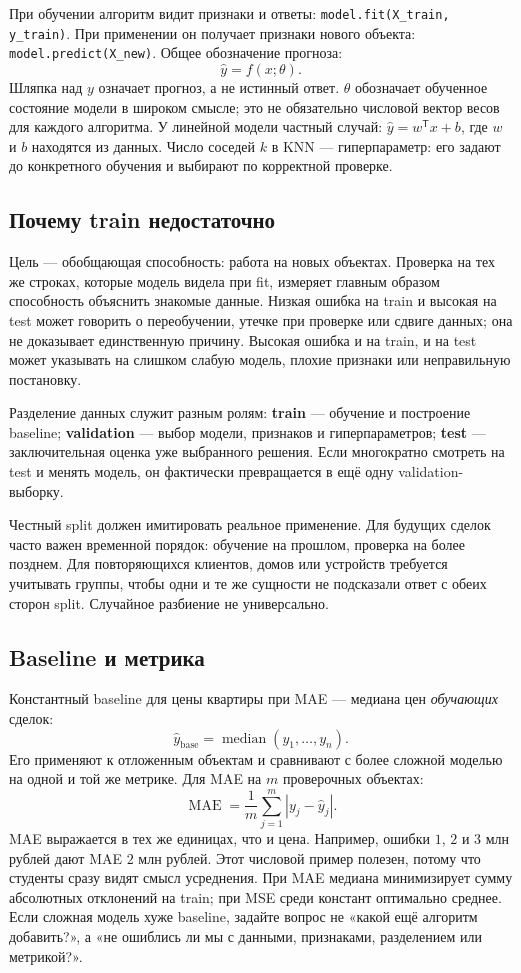 \documentclass[11pt,a4paper]{article}
\newcommand{\term}[1]{\textbf{\color{navy}#1}}
\begin{document}
При обучении алгоритм видит признаки и ответы: \texttt{model.fit(X\_train, y\_train)}. При применении он получает признаки нового объекта: \texttt{model.predict(X\_new)}. Общее обозначение прогноза:
\[
\hat y=f(x;\theta).
\]
Шляпка над $y$ означает прогноз, а не истинный ответ. $\theta$ обозначает обученное состояние модели в широком смысле; это не обязательно числовой вектор весов для каждого алгоритма. У линейной модели частный случай: $\hat y=w^{\mathsf T}x+b$, где $w$ и $b$ находятся из данных. Число соседей $k$ в KNN --- гиперпараметр: его задают до конкретного обучения и выбирают по корректной проверке.

\subsection{Почему train недостаточно}

Цель --- обобщающая способность: работа на новых объектах. Проверка на тех же строках, которые модель видела при fit, измеряет главным образом способность объяснить знакомые данные. Низкая ошибка на train и высокая на test может говорить о переобучении, утечке при проверке или сдвиге данных; она не доказывает единственную причину. Высокая ошибка и на train, и на test может указывать на слишком слабую модель, плохие признаки или неправильную постановку.

Разделение данных служит разным ролям: \term{train} --- обучение и построение baseline; \term{validation} --- выбор модели, признаков и гиперпараметров; \term{test} --- заключительная оценка уже выбранного решения. Если многократно смотреть на test и менять модель, он фактически превращается в ещё одну validation-выборку.

Честный split должен имитировать реальное применение. Для будущих сделок часто важен временной порядок: обучение на прошлом, проверка на более позднем. Для повторяющихся клиентов, домов или устройств требуется учитывать группы, чтобы одни и те же сущности не подсказали ответ с обеих сторон split. Случайное разбиение не универсально.

\subsection{Baseline и метрика}

Константный baseline для цены квартиры при MAE --- медиана цен \emph{обучающих} сделок:
\[
\hat y_{\mathrm{base}}=\operatorname{median}(y_1,\ldots,y_n).
\]
Его применяют к отложенным объектам и сравнивают с более сложной моделью на одной и той же метрике. Для MAE на $m$ проверочных объектах:
\[
\operatorname{MAE}=\frac{1}{m}\sum_{j=1}^{m}\left|y_j-\hat y_j\right|.
\]
MAE выражается в тех же единицах, что и цена. Например, ошибки $1$, $2$ и $3$ млн рублей дают MAE $2$ млн рублей. Этот числовой пример полезен, потому что студенты сразу видят смысл усреднения. При MAE медиана минимизирует сумму абсолютных отклонений на train; при MSE среди констант оптимально среднее. Если сложная модель хуже baseline, задайте вопрос не «какой ещё алгоритм добавить?», а «не ошиблись ли мы с данными, признаками, разделением или метрикой?».
\end{document}
